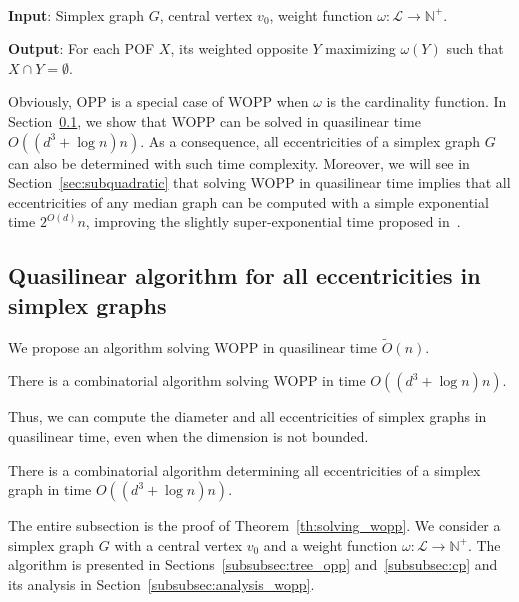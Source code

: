 \documentclass[a4paper,UKenglish,numberwithinsect,cleveref, autoref]{lipics-v2021}
\begin{document}
\begin{definition}[WOPP]~

\textbf{Input}: Simplex graph $G$, central vertex $v_0$, weight function $\omega : \mathcal{L} \rightarrow \mathbb{N}^+$.

\textbf{Output}: For each POF $X$, its weighted opposite $Y$ maximizing $\omega(Y)$ such that $X \cap Y = \emptyset$.
\label{def:wdpp}
\end{definition}

Obviously, OPP is a special case of WOPP when $\omega$ is the cardinality function. In Section~\ref{subsec:partitioning}, we show that WOPP can be solved in quasilinear time $O((d^3+\log n)n)$. As a consequence, all eccentricities of a simplex graph $G$ can also be determined with such time complexity. Moreover, we will see in Section~\ref{sec:subquadratic} that solving WOPP in quasilinear time implies that all eccentricities of any median graph can be computed with a simple exponential time $2^{O(d)}n$, improving the slightly super-exponential time proposed in~\cite{BeHa21}.

\subsection{Quasilinear algorithm for all eccentricities in simplex graphs} \label{subsec:partitioning}

We propose an algorithm solving WOPP in quasilinear time $\tilde{O}(n)$. 

\begin{theorem}
There is a combinatorial algorithm solving WOPP in time $O((d^3+\log n)n)$. 
\label{th:solving_wopp}
\end{theorem}

Thus, we can compute the diameter and all eccentricities of simplex graphs in quasilinear time, even when the dimension is not bounded.

\begin{corollary}
There is a combinatorial algorithm determining all eccentricities of a simplex graph in time $O((d^3+\log n)n)$.
\label{co:linear_simplex}
\end{corollary}


The entire subsection is the proof of Theorem~\ref{th:solving_wopp}. We consider a simplex graph $G$ with a central vertex $v_0$ and a weight function $\omega : \mathcal{L} \rightarrow \mathbb{N}^+$. The algorithm is presented in Sections~\ref{subsubsec:tree_opp} and~\ref{subsubsec:cp} and its analysis in Section~\ref{subsubsec:analysis_wopp}.
\end{document}
